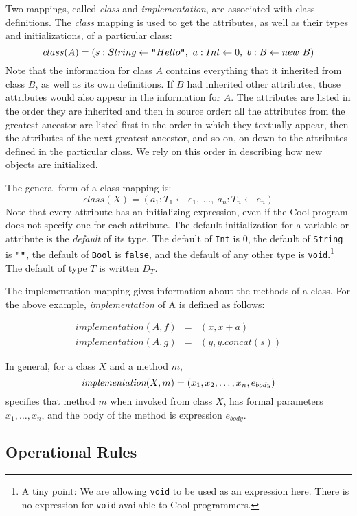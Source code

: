 \documentclass[11pt]{article}
\newcommand {\m}{\mbox}
\newcommand{\dq}{\m{\tt "}}
\newcommand{\attr}[3]{#1:#2\leftarrow#3}
\newcommand{\classmap}[2]{class(#1) = (#2)}
\begin{document}
Two mappings, called {\em class} and {\em implementation}, are associated 
with class definitions.  The {\em class} mapping is
used to get the attributes, as well as their types and initializations, of a
particular class:
\[
	class(A) = (s : String \leftarrow \dq Hello \dq,\ a : Int
\leftarrow 0,\ b : B \leftarrow new\ B)
\]
Note that the information for class $A$ contains everything that it
inherited from class $B$, as well as its own definitions. If $B$ had
inherited other attributes, those attributes would also appear in the information
for $A$. The attributes are listed in the order they are inherited
and then in source order:
all the attributes from the greatest ancestor are listed first in the
order in which they textually appear, then the attributes of the next greatest
ancestor, and so on, on down to the attributes defined in the particular class.
We rely on this order in describing how new objects are initialized.

The general form of a class mapping is:
\[
	\classmap{X}{\attr{a_1}{T_1}{e_1},\ \ldots,\ \attr{a_n}{T_n}{e_n}}
\]
Note that every attribute has an initializing expression, even if the
Cool program does not specify one for each attribute. The default
initialization for a variable or attribute is the {\em default} of
its type.  The default of {\tt Int} is 0, the default of {\tt String} 
is $\dq\dq$, the default of {\tt Bool} is {\tt false}, and the default
of any other type is {\tt void}.\footnote{A tiny point: We are
allowing {\tt void} to be used as an expression here.  There is no
expression for {\tt void} available to Cool programmers.}
The default of type $T$ is 
written $D_T$.

The implementation mapping gives information about the methods of
a class. For the above example, {\em implementation} of A  is defined as
follows:

\[
\begin{array}{rcl}
	implementation(A,f) & = & (x, x+a) \\
	implementation(A,g) & = & (y, y.concat(s))
\end{array}
\]

In general, for a class $X$ and a method $m$,
\[
	\mbox{\em implementation}(X,m) = (x_1, x_2, \ldots, x_n, e_{body})
\]
specifies that method $m$ when invoked from class $X$, has formal
parameters $x_1, \ldots, x_n$, and the body of the method is expression
$e_{body}$.

\subsection{Operational Rules}
\end{document}
